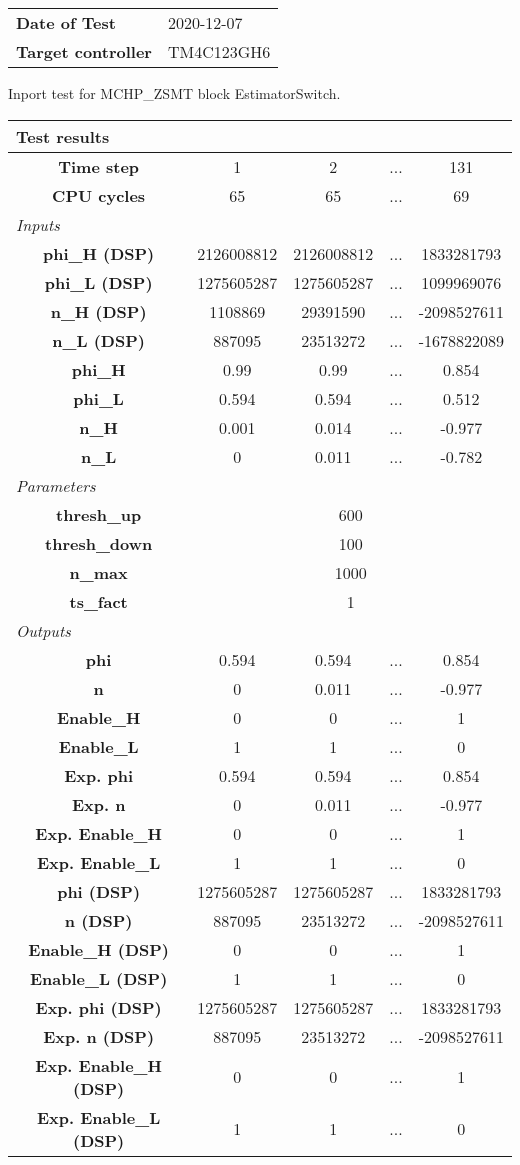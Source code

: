 \begin{tabular}{l l}
\textbf{Date of Test} & 2020-12-07 \tabularnewline
\textbf{Target controller} & TM4C123GH6 \tabularnewline
\end{tabular}
\vspace{1ex}
Inport test for MCHP_ZSMT block EstimatorSwitch.

\vspace{1em}
\begin{tabularx}{\textwidth}{|c|c|c|>{\centering\arraybackslash}X|c|}
\hline
\multicolumn{5}{|l|}{\cellcolor[gray]{0.8}\textbf{Test results}} \tabularnewline \hline
\textbf{Time step} & 1 & 2 & ... & 131 \tabularnewline \hline
\textbf{CPU cycles} & 65 & 65 & ... & 69 \tabularnewline \hline
\multicolumn{5}{|l|}{\cellcolor[gray]{0.9}\textit{Inputs}} \tabularnewline \hline
\textbf{phi\_H (DSP)} & 2126008812 & 2126008812 & ... & 1833281793 \tabularnewline \hline
\textbf{phi\_L (DSP)} & 1275605287 & 1275605287 & ... & 1099969076 \tabularnewline \hline
\textbf{n\_H (DSP)} & 1108869 & 29391590 & ... & -2098527611 \tabularnewline \hline
\textbf{n\_L (DSP)} & 887095 & 23513272 & ... & -1678822089 \tabularnewline \hline
\textbf{phi\_H} & 0.99 & 0.99 & ... & 0.854 \tabularnewline \hline
\textbf{phi\_L} & 0.594 & 0.594 & ... & 0.512 \tabularnewline \hline
\textbf{n\_H} & 0.001 & 0.014 & ... & -0.977 \tabularnewline \hline
\textbf{n\_L} & 0 & 0.011 & ... & -0.782 \tabularnewline \hline
\multicolumn{5}{|l|}{\cellcolor[gray]{0.9}\textit{Parameters}} \tabularnewline \hline
\textbf{thresh\_up} & \multicolumn{4}{c|}{600} \tabularnewline \hline
\textbf{thresh\_down} & \multicolumn{4}{c|}{100} \tabularnewline \hline
\textbf{n\_max} & \multicolumn{4}{c|}{1000} \tabularnewline \hline
\textbf{ts\_fact} & \multicolumn{4}{c|}{1} \tabularnewline \hline
\multicolumn{5}{|l|}{\cellcolor[gray]{0.9}\textit{Outputs}} \tabularnewline \hline
\textbf{phi} & 0.594 & 0.594 & ... & 0.854 \tabularnewline \hline
\textbf{n} & 0 & 0.011 & ... & -0.977 \tabularnewline \hline
\textbf{Enable\_H} & 0 & 0 & ... & 1 \tabularnewline \hline
\textbf{Enable\_L} & 1 & 1 & ... & 0 \tabularnewline \hline
\textbf{Exp. phi} & 0.594 & 0.594 & ... & 0.854 \tabularnewline \hline
\textbf{Exp. n} & 0 & 0.011 & ... & -0.977 \tabularnewline \hline
\textbf{Exp. Enable\_H} & 0 & 0 & ... & 1 \tabularnewline \hline
\textbf{Exp. Enable\_L} & 1 & 1 & ... & 0 \tabularnewline \hline
\textbf{phi (DSP)} & 1275605287 & 1275605287 & ... & 1833281793 \tabularnewline \hline
\textbf{n (DSP)} & 887095 & 23513272 & ... & -2098527611 \tabularnewline \hline
\textbf{Enable\_H (DSP)} & 0 & 0 & ... & 1 \tabularnewline \hline
\textbf{Enable\_L (DSP)} & 1 & 1 & ... & 0 \tabularnewline \hline
\textbf{Exp. phi (DSP)} & 1275605287 & 1275605287 & ... & 1833281793 \tabularnewline \hline
\textbf{Exp. n (DSP)} & 887095 & 23513272 & ... & -2098527611 \tabularnewline \hline
\textbf{Exp. Enable\_H (DSP)} & 0 & 0 & ... & 1 \tabularnewline \hline
\textbf{Exp. Enable\_L (DSP)} & 1 & 1 & ... & 0 \tabularnewline \hline
\end{tabularx}
\vspace{1ex}

